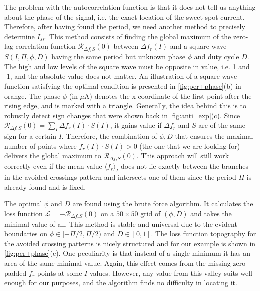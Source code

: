 \documentclass[%
 aip,
 draft,
 amsmath,amssymb,
 reprint,%
]{revtex4-1}
\begin{document}
The problem with the autocorrelation function is that it does not tell us anything about the phase of the signal, i.e. the exact location of the sweet spot current. Therefore, after having found the period, we need another method to precisely determine $I_{ss}$. This method consists of finding the global maximum of the zero-lag correlation function $\mathcal{R}_{\Delta f_r S}(0)$ between $\Delta f_r(I)$ and a square wave $S(I, \Pi, \phi, D)$ having the same period but unknown phase $\phi$ and duty cycle $D$. 
The high and low levels of the square wave must be opposite in value, i.e. 1 and -1, and the absolute value does not matter.  An illustration of a square wave function satisfying the optimal condition is presented in \autoref{fig:per+phase}(b) in orange. The phase $\phi$ (in $\mu$A) denotes the x-coordinate of the first point after the rising edge, and is marked with a triangle. Generally, the idea behind this is to robustly detect sign changes that were shown back in \autoref{fig:anti_exp}(c). Since $\mathcal{R}_{\Delta f_r S}(0) = \sum_I \Delta f_r(I) \cdot S(I) $, it gains value if $\Delta f_r$ and $S$ are of the same sign for a certain $I$. Therefore, the combination of $\phi, D$ that ensures the maximal number of points where $f_r(I)\cdot S(I)>0$ (the one that we are looking for) delivers the global maximum to $\mathcal{R}_{\Delta f_r S}(0)$. This approach will still work correctly even if the mean value $\langle f_r \rangle_{I}$ does not lie exactly between the branches in the avoided crossings pattern and intersects one of them since the period $\Pi$ is already found and is fixed. 

The optimal $\phi$ and $D$ are found using the brute force algorithm. It calculates the loss function $\mathcal{L} = - \mathcal{R}_{\Delta f_r S}(0)$ on a $50 \times 50$ grid of $(\phi, D)$ and takes the minimal value of all. This method is stable and universal due to the evident boundaries on $\phi \in [-\Pi/2,\Pi/2)$ and $D \in [0, 1]$. The loss function topography for the avoided crossing patterns is nicely structured and for our example is shown in \autoref{fig:per+phase}(c). One peculiarity is that instead of a single minimum it has an area of the same minimal value. Again, this effect comes from the missing zero-padded $f_r$ points at some $I$ values. However, any value from this valley suits well enough for our purposes, and the algorithm finds no difficulty in locating it.
\end{document}
